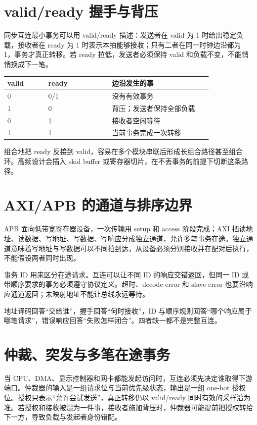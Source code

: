 \section{valid/ready 握手与背压}

同步互连最小事务可以用 valid/ready 描述：发送者在 valid 为 1 时给出稳定负载，接收者在 ready 为 1 时表示本拍能够接收；只有二者在同一时钟边沿都为 1，事务才真正转移。若 ready 拉低，发送者必须保持 valid 和负载不变，不能悄悄换成下一笔。

\begin{longtable}{L{0.18\linewidth}L{0.28\linewidth}L{0.44\linewidth}}
\toprule
valid & ready & 边沿发生的事 \\
 & 0/1 & 没有有效事务 \\
1 & 0 & 背压；发送者保持全部负载 \\
0 & 1 & 接收者空闲等待 \\
1 & 1 & 当前事务完成一次转移 \\
\bottomrule
\end{longtable}

组合地把 ready 反接到 valid，容易在多个模块串联后形成长组合路径甚至组合环。高频设计会插入 skid buffer 或寄存器切片，在不丢事务的前提下切断这条路径。

\section{AXI/APB 的通道与排序边界}

APB 面向低带宽寄存器设备，一次传输用 setup 和 access 阶段完成；AXI 把读地址、读数据、写地址、写数据、写响应分成独立通道，允许多笔事务在途。独立通道意味着写地址与写数据可以不同拍到达，从设备必须分别接收并在配对后执行，不能假设两者同时出现。

事务 ID 用来区分在途请求。互连可以让不同 ID 的响应交错返回，但同一 ID 或带顺序要求的事务必须遵守协议定义。超时、decode error 和 slave error 也要沿响应通道返回；未映射地址不能让总线永远等待。

\begin{keyidea}
地址译码回答“交给谁”，握手回答“何时接收”，ID 与顺序规则回答“哪个响应属于哪笔请求”，错误响应回答“失败怎样闭合”。四者缺一都不是完整互连。
\end{keyidea}

\section{仲裁、突发与多笔在途事务}

当 CPU、DMA、显示控制器和网卡都能发起访问时，互连必须先决定谁取得下游端口。仲裁器的输入是一组请求位与当前优先级状态，输出是一组 one-hot 授权位。授权只表示“允许尝试发送”，真正转移仍以 valid/ready 同时有效的采样沿为准。若授权和接收被混为一件事，接收者施加背压时，仲裁器可能提前把授权转给下一方，导致负载与发起者身份错配。

